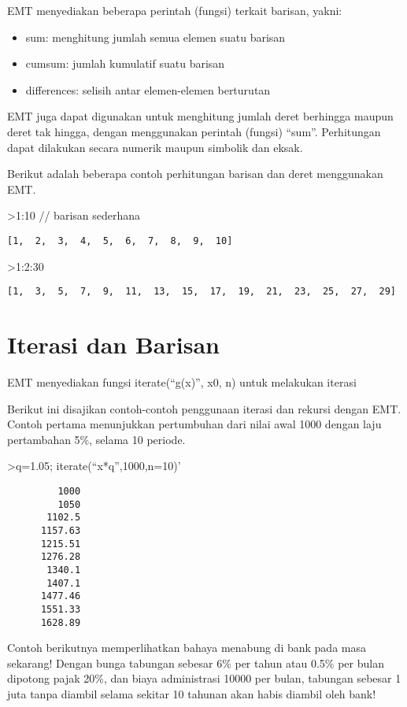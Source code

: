 \documentclass[
]{book}
\begin{document}
EMT menyediakan beberapa perintah (fungsi) terkait barisan, yakni:

\begin{itemize}
\item
  sum: menghitung jumlah semua elemen suatu barisan
\item
  cumsum: jumlah kumulatif suatu barisan
\item
  differences: selisih antar elemen-elemen berturutan
\end{itemize}

EMT juga dapat digunakan untuk menghitung jumlah deret berhingga maupun deret tak hingga, dengan menggunakan perintah (fungsi) ``sum''. Perhitungan dapat dilakukan secara numerik maupun simbolik dan eksak.

Berikut adalah beberapa contoh perhitungan barisan dan deret menggunakan EMT.

\textgreater1:10 // barisan sederhana

\begin{verbatim}
[1,  2,  3,  4,  5,  6,  7,  8,  9,  10]
\end{verbatim}

\textgreater1:2:30

\begin{verbatim}
[1,  3,  5,  7,  9,  11,  13,  15,  17,  19,  21,  23,  25,  27,  29]
\end{verbatim}

\chapter{Iterasi dan Barisan}\label{iterasi-dan-barisan}

EMT menyediakan fungsi iterate(``g(x)'', x0, n) untuk melakukan iterasi

Berikut ini disajikan contoh-contoh penggunaan iterasi dan rekursi dengan EMT. Contoh pertama menunjukkan pertumbuhan dari nilai awal 1000 dengan laju pertambahan 5\%, selama 10 periode.

\textgreater q=1.05; iterate(``x*q'',1000,n=10)'

\begin{verbatim}
         1000 
         1050 
       1102.5 
      1157.63 
      1215.51 
      1276.28 
       1340.1 
       1407.1 
      1477.46 
      1551.33 
      1628.89 
\end{verbatim}

Contoh berikutnya memperlihatkan bahaya menabung di bank pada masa sekarang! Dengan bunga tabungan sebesar 6\% per tahun atau 0.5\% per bulan dipotong pajak 20\%, dan biaya administrasi 10000 per bulan, tabungan sebesar 1 juta tanpa diambil selama sekitar 10 tahunan akan habis diambil oleh bank!
\end{document}
